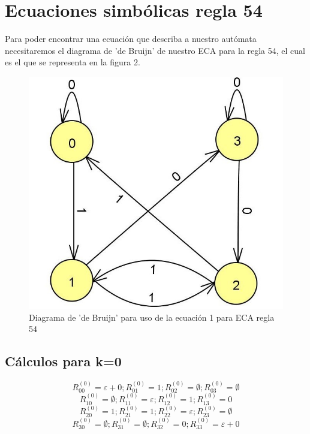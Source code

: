 \documentclass[11pt]{article}
\begin{document}
	\section{Ecuaciones simbólicas regla 54}
		Para poder encontrar una ecuación que describa a nuestro autómata necesitaremos el diagrama de 			'de Bruijn' de nuestro ECA para la regla 54, el cual es el que se representa en la figura 2.			\begin{figure}[H]
			\centering
			\includegraphics[scale=0.5]{resources/rule54f.jpg}
			\caption{Diagrama de 'de Bruijn' para uso de la ecuación 1 para ECA regla 54}\label{fig:picture}
		\end{figure}
		\subsection{Cálculos para k=0}
			\[R_{00}^{(0)}=\varepsilon+0; R_{01}^{(0)}=1; R_{02}^{(0)}=\emptyset;
			  R_{03}^{(0)}=\emptyset\]
			\[R_{10}^{(0)}=\emptyset; R_{11}^{(0)}=\varepsilon; R_{12}^{(0)}=1;
			  R_{13}^{(0)}=0\]
			\[R_{20}^{(0)}=1; R_{21}^{(0)}=1; R_{22}^{(0)}=\varepsilon;
			  R_{23}^{(0)}=\emptyset\]
			\[R_{30}^{(0)}=\emptyset; R_{31}^{(0)}=\emptyset; R_{32}^{(0)}=0;
			  R_{33}^{(0)}=\varepsilon+0\]
\end{document}
